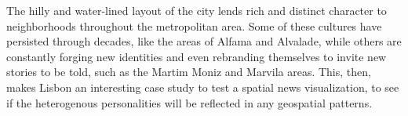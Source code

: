 The hilly and water-lined layout of the city lends rich and distinct character to neighborhoods throughout the metropolitan area. Some of these cultures have persisted through decades, like the areas of Alfama and Alvalade, while others are constantly forging new identities and even rebranding themselves to invite new stories to be told, such as the Martim Moniz and Marvila areas. This, then, makes Lisbon an interesting case study to test a spatial news visualization, to see if the heterogenous personalities will be reflected in any geospatial patterns.






